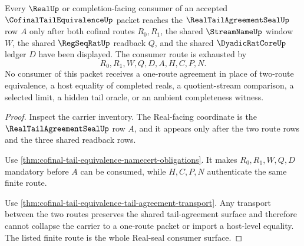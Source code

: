 \begin{theorem}
\label{thm:cofinal-tail-equivalence-real-seal-consumer}
Every $\RealUp$ or completion-facing consumer of an accepted $\CofinalTailEquivalenceUp$ packet reaches the $\RealTailAgreementSealUp$ row $A$ only after both cofinal routes $R_0,R_1$, the shared $\StreamNameUp$ window $W$, the shared $\RegSeqRatUp$ readback $Q$, and the shared $\DyadicRatCoreUp$ ledger $D$ have been displayed. The consumer route is exhausted by
$$
R_0,R_1,W,Q,D,A,H,C,P,N.
$$
No consumer of this packet receives a one-route agreement in place of two-route equivalence, a host equality of completed reals, a quotient-stream comparison, a selected limit, a hidden tail oracle, or an ambient completeness witness.
\end{theorem}
\begin{proof}
Inspect the carrier inventory. The Real-facing coordinate is the $\RealTailAgreementSealUp$ row $A$, and it appears only after the two route rows and the three shared readback rows.

Use \autoref{thm:cofinal-tail-equivalence-namecert-obligations}. It makes $R_0,R_1,W,Q,D$ mandatory before $A$ can be consumed, while $H,C,P,N$ authenticate the same finite route.

Use \autoref{thm:cofinal-tail-equivalence-tail-agreement-transport}. Any transport between the two routes preserves the shared tail-agreement surface and therefore cannot collapse the carrier to a one-route packet or import a host-level equality. The listed finite route is the whole Real-seal consumer surface.
\end{proof}


